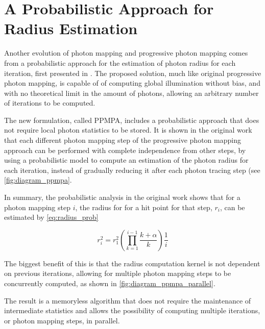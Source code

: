 \documentclass[main.tex]{subfiles}
\begin{document}
\section{A Probabilistic Approach for Radius Estimation} \label{section:ppmpa}

Another evolution of photon mapping and progressive photon mapping comes from a probabilistic approach for the estimation of photon radius for each iteration, first presented in \cite{knaus2011progressive}. The proposed solution, much like original progressive photon mapping, is capable of of computing global illumination without bias, and with no theoretical limit in the amount of photons, allowing an arbitrary number of iterations to be computed.

The new formulation, called PPMPA, includes a probabilistic approach that does not require local photon statistics to be stored. It is shown in the original work that each different photon mapping step of the progressive photon mapping approach can be performed with complete independence from other steps, by using a probabilistic model to compute an estimation of the photon radius for each iteration, instead of gradually reducing it after each photon tracing step (see \cref{fig:diagram_ppmpa}.


In summary, the probabilistic analysis in the original work shows that for a photon mapping step $i$, the radius for for a hit point for that step, $r_{i}$, can be estimated by \cref{eq:radius_prob}

\begin{figure}[!htp]
  \begin{equation}
    r^{2}_{i} = r^{2}_{1} (\prod\limits^{i-1}_{k=1} \frac{k + \alpha}{k}) \frac{1}{i}
  \label{eq:radius_prob}
  \end{equation}
\end{figure}


The biggest benefit of this is that the radius computation kernel is not dependent on previous iterations, allowing for multiple photon mapping steps to be concurrently computed, as shown in \cref{fig:diagram_ppmpa_parallel}.


The result is a memoryless algorithm that does not require the maintenance of intermediate statistics and allows the possibility of computing multiple iterations, or photon mapping steps, in parallel.
\end{document}
